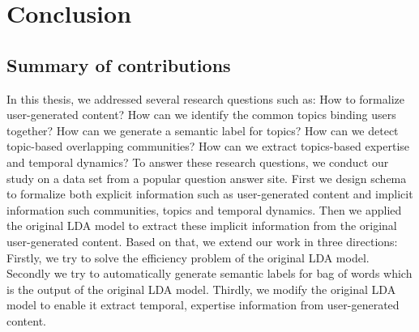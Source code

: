 \chapter{Conclusion}
\doublespacing
\label{chap:intro}
\minitoc

\section{Summary of contributions}


In this thesis, we addressed several research questions such as: How to formalize user-generated content? How can we identify the common topics binding users together? How can we generate a semantic label for topics? How can we detect topic-based overlapping communities? How can we extract topics-based expertise and temporal dynamics? To answer these research questions, we conduct our study on a data set from a popular question answer site. 
First we design schema to formalize both explicit information such as user-generated content and implicit information such communities, topics and temporal dynamics.
Then we applied the original LDA model to extract these implicit information from the original user-generated content. Based on that, we extend our work in three directions: Firstly, we try to solve the efficiency problem of the original LDA model. Secondly we try to automatically generate semantic labels for bag of words which is the output of the original LDA model. Thirdly, we modify the original LDA model to enable it extract temporal, expertise information from user-generated content. 

